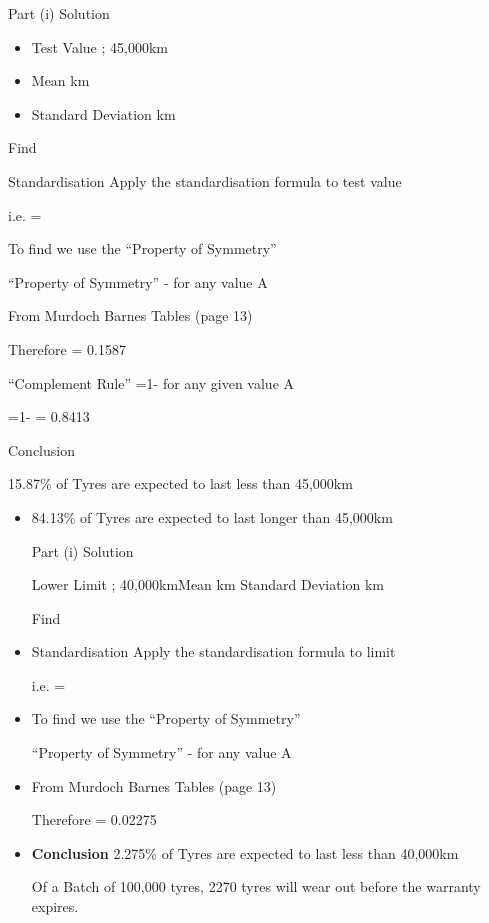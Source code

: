 \begin{itemize}
Part (i) Solution

\begin{itemize}
\item Test Value ; 45,000km
\item Mean km
\item Standard Deviation km
\end{itemize}


Find  

Standardisation
Apply the standardisation formula to test value


i.e.  = 

To find   we use the “Property of Symmetry”

“Property of Symmetry” -   for any value A

From Murdoch Barnes Tables (page 13)  

Therefore   = 0.1587 

“Complement Rule” =1-  for any given value A

=1-  = 0.8413

Conclusion

15.87\% of Tyres are expected to last less than 45,000km

\begin{itemize}
\item 84.13\% of Tyres are expected to last longer than 45,000km




Part (i) Solution

Lower Limit ; 40,000kmMean km
Standard Deviation km

Find  

\item Standardisation
Apply the standardisation formula to limit


i.e.  = 

\item To find   we use the “Property of Symmetry”

“Property of Symmetry” -   for any value A


\item From Murdoch Barnes Tables (page 13)  

Therefore   = 0.02275 

\item \textbf{Conclusion}
2.275\% of Tyres are expected to last less than 40,000km

Of a Batch of 100,000 tyres,  2270 tyres will wear out before the warranty expires.
\end{itemize}



\end{itemize}
